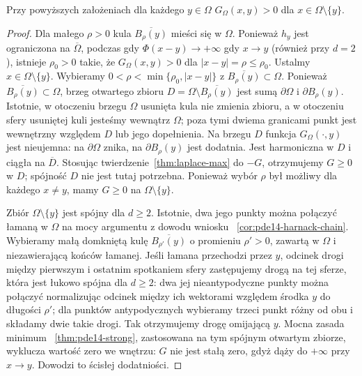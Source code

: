 \begin{twierdzenie}
\label{thm:pde14-green-pos}
Przy powyższych założeniach dla każdego $y\in\Omega$
$G_\Omega(x,y)>0$ dla $x\in\Omega\setminus\{y\}$.
\end{twierdzenie}
\begin{proof}
Dla małego $\rho>0$ kula $\overline{B_\rho(y)}$ mieści
się w $\Omega$. Ponieważ $h_y$ jest ograniczona na
$\overline\Omega$, podczas gdy $\Phi(x-y)\to+\infty$
gdy $x\to y$ (również przy $d=2$), istnieje $\rho_0>0$
takie, że $G_\Omega(x,y)>0$ dla $|x-y|=\rho\le\rho_0$.
Ustalmy $x\in\Omega\setminus\{y\}$. Wybieramy
$0<\rho<\min\{\rho_0,|x-y|\}$ z
$\overline{B_\rho(y)}\subset\Omega$.
Ponieważ $\overline{B_\rho(y)}\subset\Omega$, brzeg
otwartego zbioru $D=\Omega\setminus\overline{B_\rho(y)}$
jest sumą $\partial\Omega$ i $\partial B_\rho(y)$.
Istotnie, w otoczeniu brzegu $\Omega$ usunięta kula
nie zmienia zbioru, a w otoczeniu sfery usuniętej kuli
jesteśmy wewnątrz $\Omega$; poza tymi dwiema granicami
punkt jest wewnętrzny względem $D$ lub jego dopełnienia.
Na brzegu $D$ funkcja $G_\Omega(\cdot,y)$ jest nieujemna: na $\partial\Omega$
znika, na $\partial B_\rho(y)$ jest dodatnia.
Jest harmoniczna w $D$ i ciągła na $\overline D$.
Stosując twierdzenie~\ref{thm:laplace-max} do $-G$,
otrzymujemy $G\ge0$ w $D$; spójność $D$ nie jest tutaj
potrzebna. Ponieważ wybór $\rho$ był możliwy dla każdego
$x\ne y$, mamy $G\ge0$ na $\Omega\setminus\{y\}$.

Zbiór $\Omega\setminus\{y\}$ jest spójny dla $d\ge2$.
Istotnie, dwa jego punkty można połączyć łamaną w $\Omega$
na mocy argumentu z dowodu wniosku
~\ref{cor:pde14-harnack-chain}. Wybieramy małą domkniętą
kulę $\overline{B_{\rho'}(y)}$ o promieniu $\rho'>0$,
zawartą w $\Omega$ i niezawierającą końców łamanej. Jeśli łamana przechodzi przez $y$,
odcinek drogi między pierwszym i ostatnim spotkaniem
sfery zastępujemy drogą na tej sferze, która jest
łukowo spójna dla $d\ge2$: dwa jej nieantypodyczne
punkty można połączyć normalizując odcinek między
ich wektorami względem środka $y$ do długości $\rho'$;
dla punktów antypodycznych wybieramy trzeci punkt
różny od obu i składamy dwie takie drogi.
Tak otrzymujemy drogę omijającą $y$. Mocna zasada minimum
~\ref{thm:pde14-strong}, zastosowana na tym spójnym
otwartym zbiorze, wyklucza wartość zero we wnętrzu:
$G$ nie jest stałą zero, gdyż dąży do $+\infty$
przy $x\to y$. Dowodzi to ścisłej dodatniości.
\end{proof}

